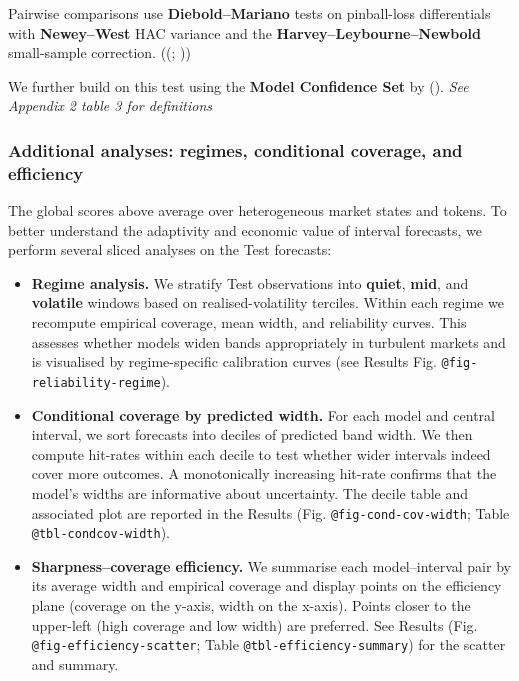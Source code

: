 \documentclass[
  a4paper,
  DIV=11,
  numbers=noendperiod]{scrreprt}
\begin{document}
Pairwise comparisons use \textbf{Diebold--Mariano} tests on pinball-loss
differentials with \textbf{Newey--West} HAC variance and the
\textbf{Harvey--Leybourne--Newbold} small-sample correction.
((;
))

We further build on this test using the \textbf{Model Confidence Set} by
(). \emph{See Appendix 2
table 3 for definitions}

\subsubsection{Additional analyses: regimes, conditional coverage, and
efficiency}\label{additional-analyses-regimes-conditional-coverage-and-efficiency}

The global scores above average over heterogeneous market states and
tokens. To better understand the adaptivity and economic value of
interval forecasts, we perform several sliced analyses on the Test
forecasts:

\begin{itemize}
\item
  \textbf{Regime analysis.} We stratify Test observations into
  \textbf{quiet}, \textbf{mid}, and \textbf{volatile} windows based on
  realised-volatility terciles. Within each regime we recompute
  empirical coverage, mean width, and reliability curves. This assesses
  whether models widen bands appropriately in turbulent markets and is
  visualised by regime-specific calibration curves (see Results Fig.
  \texttt{@fig-reliability-regime}).
\item
  \textbf{Conditional coverage by predicted width.} For each model and
  central interval, we sort forecasts into deciles of predicted band
  width. We then compute hit-rates within each decile to test whether
  wider intervals indeed cover more outcomes. A monotonically increasing
  hit-rate confirms that the model's widths are informative about
  uncertainty. The decile table and associated plot are reported in the
  Results (Fig. \texttt{@fig-cond-cov-width}; Table
  \texttt{@tbl-condcov-width}).
\item
  \textbf{Sharpness--coverage efficiency.} We summarise each
  model--interval pair by its average width and empirical coverage and
  display points on the efficiency plane (coverage on the y-axis, width
  on the x-axis). Points closer to the upper-left (high coverage and low
  width) are preferred. See Results (Fig.
  \texttt{@fig-efficiency-scatter}; Table
  \texttt{@tbl-efficiency-summary}) for the scatter and summary.
\end{itemize}
\end{document}
